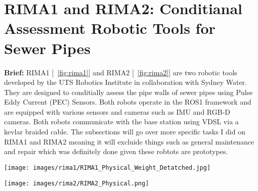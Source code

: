 \section{RIMA1 and RIMA2: Conditianal Assessment Robotic Tools for Sewer Pipes}

\label{sec:industry}

\textbf{Brief: } RIMA1 [~\ref{fig:rima1}] and RIMA2 [~\ref{fig:rima2}] are two robotic tools developed by the UTS Robotics Institute in collaboration with Sydney Water. They are designed to conditially assess the pipe walls of sewer 
pipes using Pulse Eddy Current (PEC) Sensors. Both robots operate in the ROS1 framework and are equipped with various sensors and cameras such as IMU and RGB-D cameras. Both robots communicate with the base station using VDSL via a 
kevlar braided cable. The subsections will go over more specific tasks I did on RIMA1 and RIMA2 meaning it will excluide things such as general maintenance and repair which was definitely done given these robtots are prototypes.

\begin{figure*}[htbp]
    \centering
    \begin{minipage}[t]{0.48\textwidth}
        \centering
        \texttt{[image: images/rima1/RIMA1\_Physical\_Weight\_Detatched.jpg]}
        \caption{RIMA1}
        \label{fig:rima1}
    \end{minipage}
    \hfill
    \begin{minipage}[t]{0.48\textwidth}
        \centering
        \texttt{[image: images/rima2/RIMA2\_Physical.png]}
        \caption{RIMA2}
        \label{fig:rima2}
    \end{minipage}
\end{figure*}



   